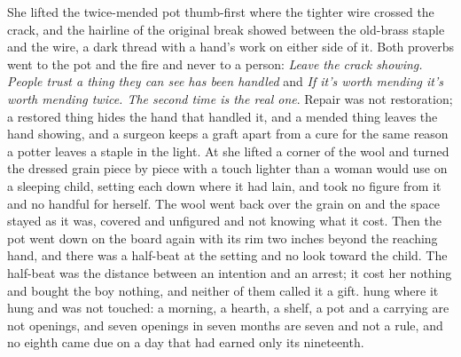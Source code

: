 She lifted the twice-mended pot thumb-first where the tighter wire crossed the crack, and the hairline of the original break showed between the old-brass staple and the wire, a dark thread with a hand's work on either side of it. Both proverbs went to the pot and the fire and never to a person: \emph{Leave the crack showing. People trust a thing they can see has been handled} and \emph{If it's worth mending it's worth mending twice. The second time is the real one}. Repair was not restoration; a restored thing hides the hand that handled it, and a mended thing leaves the hand showing, and a surgeon keeps a graft apart from a cure for the same reason a potter leaves a staple in the light. At  she lifted a corner of the wool and turned the dressed grain piece by piece with a touch lighter than a woman would use on a sleeping child, setting each down where it had lain, and took no figure from it and no handful for herself. The wool went back over the grain on  and the space stayed as it was, covered and unfigured and not knowing what it cost. Then the pot went down on the board again with its rim two inches beyond the reaching hand, and there was a half-beat at the setting and no look toward the child. The half-beat was the distance between an intention and an arrest; it cost her nothing and bought the boy nothing, and neither of them called it a gift.  hung where it hung and was not touched: a morning, a hearth, a shelf, a pot and a carrying are not openings, and seven openings in seven months are seven and not a rule, and no eighth came due on a day that had earned only its nineteenth.

